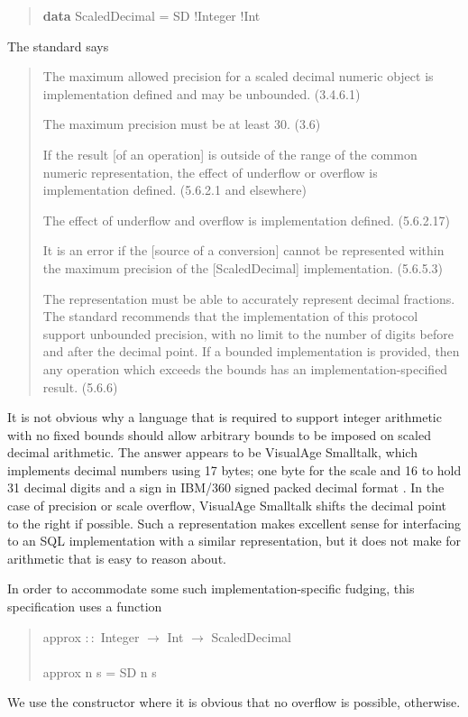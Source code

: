 \documentclass[prodmode,acmtoplas]{acmsmall}
\begin{document}
\begin{quote}
\begin{tabbing}
\sffamily \textbf{data} ScaledDecimal = SD !Integer !Int
\end{tabbing}
\end{quote}

The standard says
\begin{quote}
The maximum allowed precision for a scaled decimal numeric object is
implementation defined and may be unbounded.  (3.4.6.1)

The maximum precision must be at least 30.  (3.6)

If the result [of an operation] is outside of the range of the common
numeric representation, the effect of underflow or overflow is
implementation defined.  (5.6.2.1 and elsewhere)

The effect of underflow and overflow is implementation defined. (5.6.2.17)

It is an error if the [source of a conversion] cannot be represented
within the maximum precision of the [ScaledDecimal] implementation.
(5.6.5.3)

The representation must be able to accurately represent decimal
fractions.  The standard recommends that the implementation of this
protocol support unbounded precision, with no limit to the number of
digits before and after the decimal point.  If a bounded implementation
is provided, then any operation which exceeds the bounds has an
implementation-specified result.  (5.6.6)
\end{quote}

It is not obvious why a language that is required to support integer
arithmetic with no fixed bounds should allow arbitrary bounds to be
imposed on scaled decimal arithmetic.  The answer appears to be
VisualAge Smalltalk, which implements decimal numbers using 17 bytes;
one byte for the scale and 16 to hold 31 decimal digits and a sign in
IBM/360 signed packed decimal format \cite[chapter 8]{Z360}.
In the case of precision or scale overflow, VisualAge Smalltalk shifts
the decimal point to the right if possible.  Such a representation makes
excellent sense for interfacing to an SQL implementation with a similar
representation, but it does not make for arithmetic that is easy to
reason about.

In order to accommodate some such implementation-specific fudging,
this specification uses a function
\begin{quote}
\begin{tabbing}
\sffamily approx $::$ Integer $\rightarrow$ Int $\rightarrow$ ScaledDecimal\\
\\
\sffamily approx n s = SD n s 
\end{tabbing}
\end{quote}
We use the constructor  where it is obvious that no overflow is
possible,  otherwise.
\end{document}
